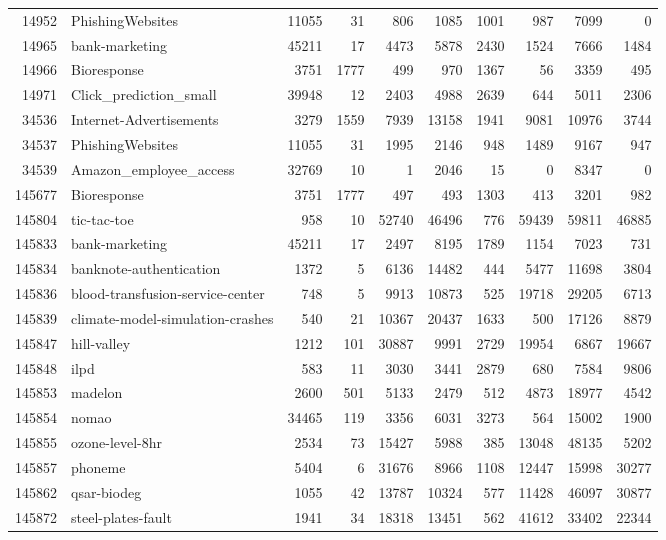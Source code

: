 \documentclass{article}
\begin{document}
\begin{table}[ht]
\begin{tabular}{rlrrrrrrrr}
  14952 & PhishingWebsites & 11055 & 31 & 806 & 1085 & 1001 & 987 & 7099 & 0 \\ 
  14965 & bank-marketing & 45211 & 17 & 4473 & 5878 & 2430 & 1524 & 7666 & 1484 \\ 
  14966 & Bioresponse & 3751 & 1777 & 499 & 970 & 1367 & 56 & 3359 & 495 \\ 
  14971 & Click\_prediction\_small & 39948 & 12 & 2403 & 4988 & 2639 & 644 & 5011 & 2306 \\ 
  34536 & Internet-Advertisements & 3279 & 1559 & 7939 & 13158 & 1941 & 9081 & 10976 & 3744 \\ 
  34537 & PhishingWebsites & 11055 & 31 & 1995 & 2146 & 948 & 1489 & 9167 & 947 \\ 
  34539 & Amazon\_employee\_access & 32769 & 10 & 1 & 2046 & 15 & 0 & 8347 & 0 \\ 
  145677 & Bioresponse & 3751 & 1777 & 497 & 493 & 1303 & 413 & 3201 & 982 \\ 
  145804 & tic-tac-toe & 958 & 10 & 52740 & 46496 & 776 & 59439 & 59811 & 46885 \\ 
  145833 & bank-marketing & 45211 & 17 & 2497 & 8195 & 1789 & 1154 & 7023 & 731 \\ 
  145834 & banknote-authentication & 1372 & 5 & 6136 & 14482 & 444 & 5477 & 11698 & 3804 \\ 
  145836 & blood-transfusion-service-center & 748 & 5 & 9913 & 10873 & 525 & 19718 & 29205 & 6713 \\ 
  145839 & climate-model-simulation-crashes & 540 & 21 & 10367 & 20437 & 1633 & 500 & 17126 & 8879 \\ 
  145847 & hill-valley & 1212 & 101 & 30887 & 9991 & 2729 & 19954 & 6867 & 19667 \\ 
  145848 & ilpd & 583 & 11 & 3030 & 3441 & 2879 & 680 & 7584 & 9806 \\ 
  145853 & madelon & 2600 & 501 & 5133 & 2479 & 512 & 4873 & 18977 & 4542 \\ 
  145854 & nomao & 34465 & 119 & 3356 & 6031 & 3273 & 564 & 15002 & 1900 \\ 
  145855 & ozone-level-8hr & 2534 & 73 & 15427 & 5988 & 385 & 13048 & 48135 & 5202 \\ 
  145857 & phoneme & 5404 & 6 & 31676 & 8966 & 1108 & 12447 & 15998 & 30277 \\ 
  145862 & qsar-biodeg & 1055 & 42 & 13787 & 10324 & 577 & 11428 & 46097 & 30877 \\ 
  145872 & steel-plates-fault & 1941 & 34 & 18318 & 13451 & 562 & 41612 & 33402 & 22344 \\ 

\end{tabular}
\end{table}
\end{document}
